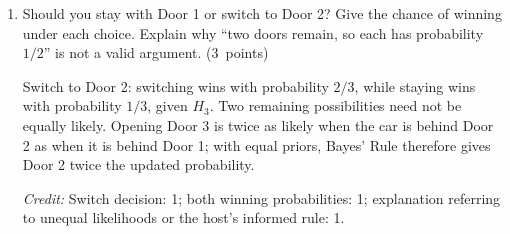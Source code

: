 \documentclass[11pt,letterpaper]{article}
\newcommand{\partpts}[1]{\unskip\nobreak\hspace{.3em}%
  \mbox{\small\color{muted}(#1 points)}}
\newcommand{\credit}[1]{\par{\footnotesize\color{muted}\textit{Credit:} #1}}
\begin{document}
\begin{enumerate}
  \item Should you stay with Door 1 or switch to Door 2? Give the chance
  of winning under each choice. Explain why ``two doors remain, so each
  has probability $1/2$'' is not a valid argument. \partpts{3}
  \begin{solution}[1in]
    Switch to Door 2: switching wins with probability $2/3$, while staying
    wins with probability $1/3$, given $H_3$. Two remaining possibilities
    need not be equally likely. Opening Door 3 is twice as likely when
    the car is behind Door 2 as when it is behind Door 1; with equal priors,
    Bayes' Rule therefore gives Door 2 twice the updated probability.
    \credit{Switch decision: 1; both winning probabilities: 1; explanation
    referring to unequal likelihoods or the host's informed rule: 1.}
  \end{solution}
\end{enumerate}

\label{quiz-last-page}
\end{document}
